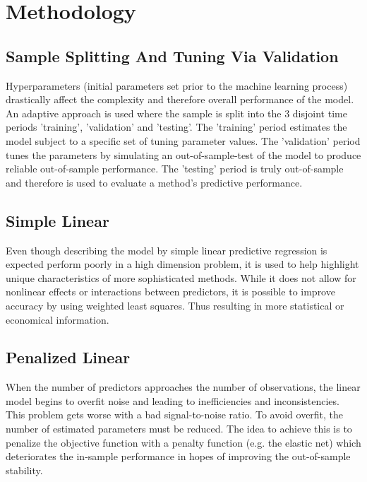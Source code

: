 \section{Methodology}

\subsection{Sample Splitting And Tuning Via Validation}
	Hyperparameters (initial parameters set prior to the machine learning process) drastically affect the complexity and therefore overall performance of the model.
	An adaptive approach is used where the sample is split into the 3 disjoint time periods 'training', 'validation' and 'testing'. The 'training' period estimates the model subject to a specific set of tuning parameter values. The 'validation' period tunes the parameters by simulating an out-of-sample-test of the model to produce reliable out-of-sample performance. The 'testing' period is truly
	out-of-sample and therefore is used to evaluate a method’s predictive performance.

\subsection{Simple Linear}
	Even though describing the model by simple linear predictive regression is expected perform poorly in a high dimension problem, it is used to help highlight unique characteristics of more sophisticated methods. While it does not allow for nonlinear effects or interactions between predictors, it is possible to improve accuracy by using weighted least squares. Thus resulting in more statistical or economical information.

\subsection{Penalized Linear}
	When the number of predictors approaches the number of observations,
	the linear model begins to overfit noise and leading to inefficiencies and inconsistencies.
	This problem gets worse with a bad signal-to-noise ratio.
	To avoid overfit, the number of estimated parameters must be reduced.
	The idea to achieve this is to penalize the objective function with a penalty
	function (e.g. the elastic net) which deteriorates the in-sample performance
	in hopes of improving the out-of-sample stability.

